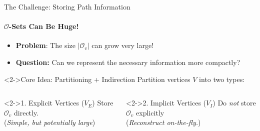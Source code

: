 \begin{frame}{The Challenge: Storing Path Information}
    \framesubtitle{$\mathcal{O}$-Sets Can Be Huge!}

    \begin{itemize}
        \item \textbf{Problem}: The size $|\mathcal{O}_v|$ can grow very large!
        \item \textbf{Question:} Can we represent the necessary information more compactly?
    \end{itemize}


    \begin{alertblock}<2->{Core Idea: Partitioning + Indirection}
        Partition vertices $V$ into two types:
    \end{alertblock}
    \vspace{-1em}
    \begin{columns}[T] %
        \begin{column}{0.48\textwidth}
            \begin{block}<2->{1. Explicit Vertices ($V_E$)}
                \centering
                Store $\mathcal{O}_v$ directly. \\
                (\textit{Simple, but potentially large})
            \end{block}
        \end{column}

        \begin{column}{0.48\textwidth}
            \begin{block}<2->{2. Implicit Vertices ($V_I$)}
                \centering
                Do \emph{not} store $\mathcal{O}_v$ explicitly \\
                (\textit{Reconstruct on-the-fly.})
            \end{block}
            \vspace{0.5em}
        \end{column}
    \end{columns}
\end{frame}

